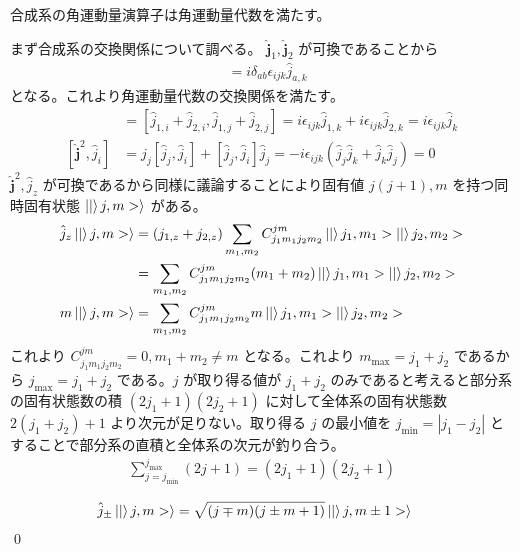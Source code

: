 \documentclass[uplatex,dvipdfmx,a4paper,11pt]{jlreq}
\makeatletter
\numberwithin{equation}{section}
\theoremstyle{definition}
\renewenvironment{proof}[1][\proofname]{\par
  \normalfont
  \topsep6\p@\@plus6\p@ \trivlist
  \item[\hskip\labelsep{\bfseries #1}\@addpunct{\bfseries}]\ignorespaces\quad\par
}{%
  \qed\endtrivlist\@endpefalse
}
\renewcommand\proofname{証明}
\makeatother
\begin{document}
\begin{theorem}
  合成系の角運動量演算子は角運動量代数を満たす。
\end{theorem}
\begin{proof}
  まず合成系の交換関係について調べる。 $\hat{\bm{j}}_1, \hat{\bm{j}}_2$ が可換であることから
  \begin{align}
    [\hat{j}_{a,i}, \hat{j}_{b,j}] & = i\delta_{ab}\epsilon_{ijk}\hat{j}_{a,k}
  \end{align}
  となる。これより角運動量代数の交換関係を満たす。
  \begin{align}
    [\hat{j}_i, \hat{j}_j]      & = [\hat{j}_{1,i} + \hat{j}_{2,i}, \hat{j}_{1,j} + \hat{j}_{2,j}] = i\epsilon_{ijk}\hat{j}_{1,k} + i\epsilon_{ijk}\hat{j}_{2,k} = i\epsilon_{ijk}\hat{j}_k \\
    [\hat{\bm{j}}^2, \hat{j}_i] & = \hat{j}_j[\hat{j}_j, \hat{j}_i] + [\hat{j}_j, \hat{j}_i]\hat{j}_j = -i\epsilon_{ijk}(\hat{j}_j\hat{j}_k + \hat{j}_k\hat{j}_j) = 0
  \end{align}
  $\hat{\bm{j}}^2, \hat{j}_z$ が可換であるから同様に議論することにより固有値 $j(j+1), m$ を持つ同時固有状態 $\ket|j, m>\rangle$ がある。
  \begin{align}
    \hat{j}_z\ket|j, m>\rangle & = (j_{1,z} + j_{2,z})\sum_{m_1, m_2}C_{j_1m_1j_2m_2}^{jm}\ket|j_1, m_1>\ket|j_2, m_2> \\
                               & = \sum_{m_1, m_2}C_{j_1m_1j_2m_2}^{jm}(m_1 + m_2)\ket|j_1, m_1>\ket|j_2, m_2>         \\
    m\ket|j, m>\rangle         & = \sum_{m_1, m_2}C_{j_1m_1j_2m_2}^{jm}m\ket|j_1, m_1>\ket|j_2, m_2>
  \end{align}
  これより $C_{j_1m_1j_2m_2}^{jm} = 0, m_1 + m_2 \neq m$ となる。これより $m_{\max} = j_1 + j_2$ であるから $j_{\max} = j_1 + j_2$ である。$j$ が取り得る値が $j_1 + j_2$ のみであると考えると部分系の固有状態数の積 $(2j_1 + 1)(2j_2 + 1)$ に対して全体系の固有状態数 $2(j_1 + j_2) + 1$ より次元が足りない。取り得る $j$ の最小値を $j_{\min} = |j_1 - j_2|$ とすることで部分系の直積と全体系の次元が釣り合う。
  \begin{align}
    \sum_{j=j_{\min}}^{j_{\max}} (2j + 1) = (2j_1 + 1)(2j_2 + 1)
  \end{align}

  \begin{align}
    \hat{j}_\pm\ket|j, m>\rangle & = \sqrt{(j\mp m)(j\pm m + 1)}\ket|j, m\pm 1>\rangle
  \end{align}
\end{proof}
\end{document}
